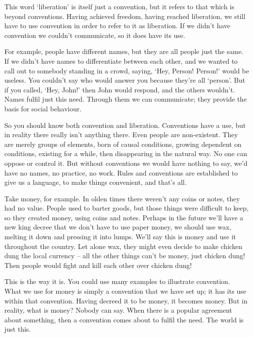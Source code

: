 This word `liberation' is itself just a convention, but it refers to that which is beyond conventions. Having achieved freedom, having reached liberation, we still have to use convention in order to refer to it as liberation. If we didn't have convention we couldn't communicate, so it does have its use. 

For example, people have different names, but they are all people just the same. If we didn't have names to differentiate between each other, and we wanted to call out to somebody standing in a crowd, saying, `Hey, Person! Person!' would be useless. You couldn't say who would answer you because they're all `person'. But if you called, `Hey, John!' then John would respond, and the others wouldn't. Names fulfil just this need. Through them we can communicate; they provide the basis for social behaviour. 

So you should know both convention and liberation. Conventions have a use, but in reality there really isn't anything there. Even people are non-existent. They are merely groups of elements, born of causal conditions, growing dependent on conditions, existing for a while, then disappearing in the natural way. No one can oppose or control it. But without conventions we would have nothing to say, we'd have no names, no practice, no work. Rules and conventions are established to give us a language, to make things convenient, and that's all. 

Take money, for example. In olden times there weren't any coins or notes, they had no value. People used to barter goods, but those things were difficult to keep, so they created money, using coins and notes. Perhaps in the future we'll have a new king decree that we don't have to use paper money, we should use wax, melting it down and pressing it into lumps. We'll say this is money and use it throughout the country. Let alone wax, they might even decide to make chicken dung the local currency -- all the other things can't be money, just chicken dung! Then people would fight and kill each other over chicken dung! 

This is the way it is. You could use many examples to illustrate convention. What we use for money is simply a convention that we have set up; it has its use within that convention. Having decreed it to be money, it becomes money. But in reality, what is money? Nobody can say. When there is a popular agreement about something, then a convention comes about to fulfil the need. The world is just this. 

